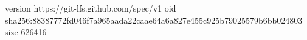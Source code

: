 version https://git-lfs.github.com/spec/v1
oid sha256:88387772fd046f7a965aada22caae64a6a827e455c925b79025579b6bb024803
size 626416
